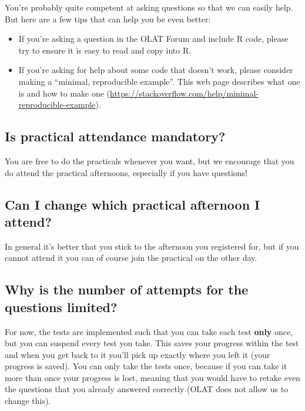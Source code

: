 \documentclass[
  letterpaper,
  8pt,
  a4paper]{book}
\begin{document}
You're probably quite competent at asking questions so that we can
easily help. But here are a few tips that can help you be even better:

\begin{itemize}
\item
  If you're asking a question in the OLAT Forum and include R code,
  please try to ensure it is easy to read and copy into R.
\item
  If you're asking for help about some code that doesn't work, please
  consider making a ``minimal, reproducible example''. This web page
  describes what one is and how to make one
  (\url{https://stackoverflow.com/help/minimal-reproducible-example}).
\end{itemize}

\subsection*{Is practical attendance
mandatory?}\label{is-practical-attendance-mandatory}

You are free to do the practicals whenever you want, but we encourage
that you do attend the practical afternoons, especially if you have
questions!

\subsection*{Can I change which practical afternoon I
attend?}\label{can-i-change-which-practical-afternoon-i-attend}

In general it's better that you stick to the afternoon you registered
for, but if you cannot attend it you can of course join the practical on
the other day.

\subsection*{Why is the number of attempts for the questions
limited?}\label{why-is-the-number-of-attempts-for-the-questions-limited}

For now, the tests are implemented such that you can take each test
\textbf{only} once, but you can suspend every test you take. This saves
your progress within the test and when you get back to it you'll pick up
exactly where you left it (your progress is saved). You can only take
the tests once, because if you can take it more than once your progress
is lost, meaning that you would have to retake even the questions that
you already answered correctly (OLAT does not allow us to change this).
\end{document}
